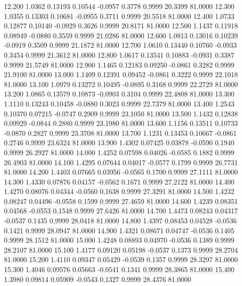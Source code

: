   12.200   1.0362   0.13193   0.10544  -0.0957   0.3778   0.9999  20.3399  81.0000
  12.300   1.0355   0.13303   0.10681  -0.0955   0.3711   0.9999  20.5518  81.0000
  12.400   1.0733   0.12877   0.10140  -0.0929   0.3626   0.9999  20.8171  81.0000
  12.500   1.1437   0.11918   0.08949  -0.0880   0.3559   0.9999  21.0286  81.0000
  12.600   1.0813   0.13016   0.10239  -0.0919   0.3509   0.9999  21.1872  81.0000
  12.700   1.0610   0.13440   0.10760  -0.0933   0.3454   0.9999  21.3612  81.0000
  12.800   1.0617   0.13541   0.10883  -0.0931   0.3387   0.9999  21.5749  81.0000
  12.900   1.1465   0.12183   0.09250  -0.0861   0.3282   0.9999  21.9100  81.0000
  13.000   1.1409   0.12391   0.09452  -0.0861   0.3222   0.9999  22.1018  81.0000
  13.100   1.0979   0.13272   0.10495  -0.0895   0.3168   0.9999  22.2729  81.0000
  13.200   1.0865   0.13579   0.10873  -0.0903   0.3104   0.9999  22.4808  81.0000
  13.300   1.1110   0.13243   0.10458  -0.0880   0.3023   0.9999  22.7379  81.0000
  13.400   1.2543   0.10370   0.07215  -0.0747   0.2909   0.9999  23.1050  81.0000
  13.500   1.1432   0.12838   0.09929  -0.0844   0.2880   0.9999  23.1980  81.0000
  13.600   1.1156   0.13511   0.10733  -0.0870   0.2827   0.9999  23.3708  81.0000
  13.700   1.1231   0.13453   0.10667  -0.0861   0.2746   0.9999  23.6324  81.0000
  13.900   1.4302   0.07425   0.03878  -0.0590   0.1940   0.9999  26.2927  81.0000
  14.000   1.4252   0.07598   0.04026  -0.0585   0.1882   0.9999  26.4903  81.0000
  14.100   1.4295   0.07644   0.04017  -0.0577   0.1799   0.9999  26.7731  81.0000
  14.200   1.4403   0.07665   0.03956  -0.0565   0.1700   0.9999  27.1111  81.0000
  14.300   1.4330   0.07876   0.04157  -0.0562   0.1671   0.9999  27.2122  81.0000
  14.400   1.4270   0.08076   0.04344  -0.0560   0.1638   0.9999  27.3291  81.0000
  14.500   1.4232   0.08247   0.04496  -0.0558   0.1599   0.9999  27.4659  81.0000
  14.600   1.4239   0.08351   0.04568  -0.0553   0.1548   0.9999  27.6426  81.0000
  14.700   1.4473   0.08243   0.04317  -0.0537   0.1435   0.9999  28.0418  81.0000
  14.800   1.4397   0.08453   0.04528  -0.0536   0.1421   0.9999  28.0947  81.0000
  14.900   1.4321   0.08671   0.04747  -0.0536   0.1405   0.9999  28.1512  81.0000
  15.000   1.4248   0.08893   0.04970  -0.0536   0.1389   0.9999  28.2107  81.0000
  15.100   1.4177   0.09120   0.05198  -0.0537   0.1373   0.9999  28.2704  81.0000
  15.200   1.4110   0.09347   0.05429  -0.0539   0.1357   0.9999  28.3297  81.0000
  15.300   1.4046   0.09576   0.05663  -0.0541   0.1341   0.9999  28.3865  81.0000
  15.400   1.3980   0.09814   0.05909  -0.0543   0.1327   0.9999  28.4376  81.0000
